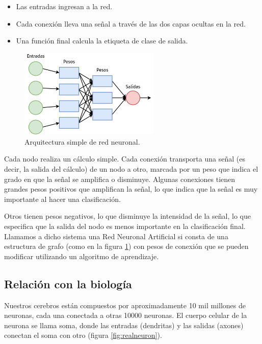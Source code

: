 \documentclass[a4paper,12pt]{article}
\begin{document}
\begin{itemize}[noitemsep, topsep=2pt]
	\item Las entradas ingresan a la red. 
	\item Cada conexión lleva una señal a través de las dos capas ocultas en la red. 
	\item Una función final calcula la etiqueta de clase de salida.
\end{itemize}

\begin{figure}[H]
	\begin{center}				
		\includegraphics[width=0.6\textwidth]{018.png}
		\caption{Arquitectura simple de red neuronal. \cite{matich}}
		\label{fig:nn}
	\end{center}
\end{figure}

Cada nodo realiza un cálculo simple. Cada conexión transporta una señal (es decir, la salida del cálculo) de un nodo a otro, marcada por un peso que indica el grado en que la señal se amplifica o disminuye. Algunas conexiones tienen grandes pesos positivos que amplifican la señal, lo que indica que la señal es muy importante al hacer una clasificación. 

\clearpage

Otros tienen pesos negativos, lo que disminuye la intensidad de la señal, lo que especifica que la salida del nodo es menos importante en la clasificación final. Llamamos a dicho sistema una Red Neuronal Artificial si consta de una estructura de grafo (como en la figura \ref{fig:nn}) con pesos de conexión que se pueden modificar utilizando un algoritmo de aprendizaje.

\subsection{Relación con la biología}
Nuestros cerebros están compuestos por aproximadamente 10 mil millones de neuronas, cada una conectada a otras 10000 neuronas. El cuerpo celular de la neurona se llama soma, donde las entradas (dendritas) y las salidas (axones) conectan el soma con otro (figura \ref{fig:realneuron}).
\end{document}
